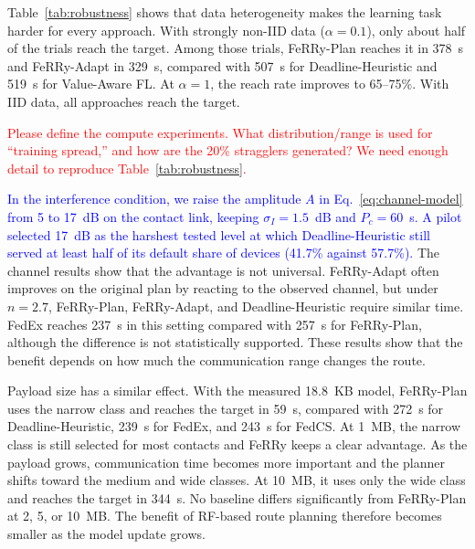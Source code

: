 \documentclass[conference]{IEEEtran}
\newcommand{\sysname}{FeRRy}
\begin{document}
Table~\ref{tab:robustness} shows that data heterogeneity makes the learning task
harder for every approach. With strongly non-IID data
(\(\alpha=0.1\)), only about half of the trials reach the target.
Among those trials, \sysname{}-Plan reaches it in 378~s and
\sysname{}-Adapt in 329~s, compared with 507~s for Deadline-Heuristic and
519~s for Value-Aware FL. At \(\alpha=1\), the reach rate improves to
65--75\%. With IID data, all approaches reach the target.

\textcolor{red}{Please define the compute experiments. What distribution/range is used for ``training spread,'' and how are the 20\% stragglers generated? We need enough detail to reproduce Table~\ref{tab:robustness}.}

\textcolor{blue}{In the interference condition, we raise the amplitude $A$ in
Eq.~\eqref{eq:channel-model} from 5 to 17~dB on the contact link, keeping
$\sigma_I=1.5$~dB and $P_c=60$~s. A pilot selected 17~dB as the harshest tested
level at which Deadline-Heuristic still served at least half of its default share
of devices (41.7\% against 57.7\%).}
The channel results show that the advantage is not universal.
\sysname{}-Adapt often improves on the original plan by reacting to the
observed channel, but under \(n=2.7\), \sysname{}-Plan,
\sysname{}-Adapt, and Deadline-Heuristic require similar time. FedEx reaches
237~s in this setting compared with 257~s for \sysname{}-Plan, although the
difference is not statistically supported. These results show that the benefit
depends on how much the communication range changes the route.

Payload size has a similar effect. With the measured 18.8~KB model,
\sysname{}-Plan uses the narrow class and reaches the target in 59~s, compared
with 272~s for Deadline-Heuristic, 239~s for FedEx, and 243~s for FedCS.
At 1~MB, the narrow class is still selected for most contacts and FeRRy keeps a
clear advantage. As the payload grows, communication time becomes more
important and the planner shifts toward the medium and wide classes. At 10~MB,
it uses only the wide class and reaches the target in 344~s. No baseline differs
significantly from \sysname{}-Plan at 2, 5, or 10~MB. The benefit of RF-based
route planning therefore becomes smaller as the model update grows.
\end{document}
